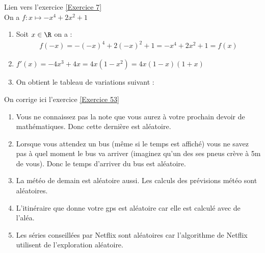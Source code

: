 \documentclass[12pt,fleqn]{report} %
\begin{document}
\begin{correction}Lien vers l'exercice   \ref{Exercice 7}\\
	On a $f:x \mapsto -x^4+2x^2+1$
	\begin{enumerate}
		\item Soit $x\in \R$ on a :
		\begin{align*}
		f(-x) = -(-x)^4+2(-x)^2+1 = -x^4+2x^2+1 = f(x)
		\end{align*}
		\item $f'(x) = -4x^3+4x = 4x(1-x^2) = 4x(1-x)(1 + x)$
		\item On obtient le tableau de variations suivant :
		\begin{center}
		\end{center}
	\end{enumerate}
\end{correction}

\begin{correction}
	On corrige ici l'exercice \ref{Exercice 53}\begin{enumerate}
		\item Vous ne connaissez pas la note que vous aurez à votre prochain devoir de mathématiques. Donc cette dernière est aléatoire.
		\item Lorsque vous attendez un bus (même si le temps est affiché) vous ne savez pas à quel moment le bus va arriver (imaginez qu'un des ses pneus crève à 5m de vous). Donc le temps d'arriver du bus est aléatoire.
		\item La météo de demain est aléatoire aussi. Les calculs des prévisions météo sont aléatoires.
		\item L'itinéraire que donne votre gps est aléatoire car elle est calculé avec de l'aléa.
		\item Les séries conseillées par Netflix sont aléatoires car l'algorithme de Netflix utilisent de l'exploration aléatoire.
	\end{enumerate}
\end{correction}
\end{document}
